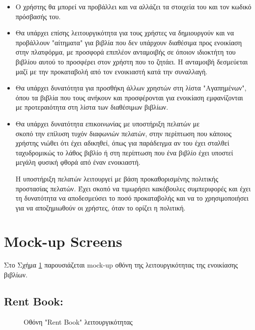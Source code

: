 \documentclass[12pt,a4paper]{article}
\begin{document}
\begin{itemize}
	\item Ο χρήστης θα μπορεί να προβάλλει και να αλλάζει τα στοιχεία του και τον κωδικό πρόσβασής του.

	\item Θα υπάρχει επίσης λειτουργικότητα για τους χρήστες να δημιουργούν και να προβάλλουν "αίτηματα" για βιβλία που δεν υπάρχουν διαθέσιμα προς ενοικίαση στην πλατφόρμα, με προσφορά επιπλέον ανταμοιβής σε όποιον ιδιοκτήτη του βιβλίου αυτού το προσφέρει στον χρήστη που το ζητάει. Η ανταμοιβή δεσμεύεται μαζί με την προκαταβολή από τον ενοικιαστή κατά την συναλλαγή.

	\item Θα υπάρχει δυνατότητα για προσθήκη άλλων χρηστών στη λίστα "Αγαπημένων", όπου τα βιβλία που τους ανήκουν και προσφέρονται για ενοικίαση εμφανίζονται με προτεραιότητα στη λίστα των διαθέσιμων βιβλίων.

	\item Θα υπάρχει δυνατότητα επικοινωνίας με υποστήριξη πελατών με \\σκοπό την επίλυση τυχόν διαφωνιών πελατών, στην περίπτωση που κάποιος χρήστης νιώθει ότι έχει αδικηθεί, όπως για παράδειγμα αν του έχει σταλθεί ταχυδρομικώς το λάθος βιβλίο ή στη περίπτωση που ένα βιβλίο έχει υποστεί μεγάλη φυσική φθορά από έναν ενοικιαστή. 

		Η υποστήριξη πελατών λειτουργεί με βάση προκαθορισμένης πολιτικής προστασίας πελατών. Έχει σκοπό να τιμωρήσει κακόβουλες συμπεριφορές και έχει τη δυνατότητα να αποδεσμεύσει το ποσό προκαταβολής και να το χρησιμοποιήσει για να αποζημιωθούν οι χρήστες, όταν το ορίζει η πολιτική.

\end{itemize}

\section{Mock-up Screens}

Στο Σχήμα \ref{Οθόνη "Rent Book" λειτουργικότητας} παρουσιάζεται mock-up οθόνη της λειτουργικότητας της ενοικίασης βιβλίων.

\subsection{Rent Book:}

\begin{figure}[H]
	\caption{Οθόνη "Rent Book" λειτουργικότητας}
	\label{Οθόνη "Rent Book" λειτουργικότητας}
\end{figure}
\end{document}
